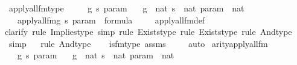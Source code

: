 \begin{isabellebody}
\isanewline
\isanewline
{}\isamarkupfalse%
\ apply{\isacharunderscore}{\kern0pt}all{\isacharunderscore}{\kern0pt}{}{\isacharunderscore}{\kern0pt}fm{\isacharunderscore}{\kern0pt}type\ {\isacharcolon}{\kern0pt}\ \isanewline
\ \ \ g\ s\ param\isanewline
\ \ \ {\isachardoublequoteopen}g\ {\isasymin}\ nat{\isachardoublequoteclose}\ {\isachardoublequoteopen}s\ {\isasymin}\ nat{\isachardoublequoteclose}\ {\isachardoublequoteopen}param\ {\isasymin}\ nat{\isachardoublequoteclose}\ \isanewline
\ \ \ {\isachardoublequoteopen}apply{\isacharunderscore}{\kern0pt}all{\isacharunderscore}{\kern0pt}{}{\isacharunderscore}{\kern0pt}fm{\isacharparenleft}{\kern0pt}g{\isacharcomma}{\kern0pt}\ s{\isacharcomma}{\kern0pt}\ param{\isacharparenright}{\kern0pt}\ {\isasymin}\ formula{\isachardoublequoteclose}\ \isanewline
%
\isadelimproof
\ \ %
\endisadelimproof
%
\isatagproof
{}\isamarkupfalse%
\ apply{\isacharunderscore}{\kern0pt}all{\isacharunderscore}{\kern0pt}{}{\isacharunderscore}{\kern0pt}fm{\isacharunderscore}{\kern0pt}def\ \isanewline
\ \ \isamarkupfalse%
{\isacharparenleft}{\kern0pt}clarify{\isacharcomma}{\kern0pt}\ rule\ Implies{\isacharunderscore}{\kern0pt}type{\isacharcomma}{\kern0pt}\ simp{\isacharcomma}{\kern0pt}\ rule\ Exists{\isacharunderscore}{\kern0pt}type{\isacharcomma}{\kern0pt}\ rule\ Exists{\isacharunderscore}{\kern0pt}type{\isacharcomma}{\kern0pt}\ rule\ And{\isacharunderscore}{\kern0pt}type{\isacharparenright}{\kern0pt}\isanewline
\ \ \ \isamarkupfalse%
\ simp\isanewline
\ \ \isamarkupfalse%
{\isacharparenleft}{\kern0pt}rule\ And{\isacharunderscore}{\kern0pt}type{\isacharparenright}{\kern0pt}\isanewline
\ \ \isamarkupfalse%
\ is{\isacharunderscore}{\kern0pt}{}{\isacharunderscore}{\kern0pt}fm{\isacharunderscore}{\kern0pt}type\ assms\ \isanewline
\ \ \isamarkupfalse%
\ auto%
\endisatagproof
{\isafoldproof}%
%
\isadelimproof
\isanewline
%
\endisadelimproof
\isanewline
{}\isamarkupfalse%
\ arity{\isacharunderscore}{\kern0pt}apply{\isacharunderscore}{\kern0pt}all{\isacharunderscore}{\kern0pt}{}{\isacharunderscore}{\kern0pt}fm\ {\isacharcolon}{\kern0pt}\isanewline
\ \ \ g\ s\ param\isanewline
\ \ \ {\isachardoublequoteopen}g\ {\isasymin}\ nat{\isachardoublequoteclose}\ {\isachardoublequoteopen}s\ {\isasymin}\ nat{\isachardoublequoteclose}\ {\isachardoublequoteopen}param\ {\isasymin}\ nat{\isachardoublequoteclose}\isanewline

\end{isabellebody}
